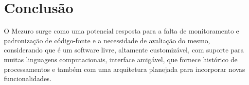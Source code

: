 \documentclass[12pt]{article}
\begin{document}
\section{Conclusão}
O Mezuro surge como uma potencial resposta para a falta de monitoramento e padronização de código-fonte e a necessidade de avaliação do mesmo, considerando que é um software livre, altamente customizável, com suporte para muitas linguagens computacionais, interface amigável, que fornece histórico de processamentos e também com uma arquitetura planejada para incorporar novas funcionalidades.
\newpage


\end{document}
